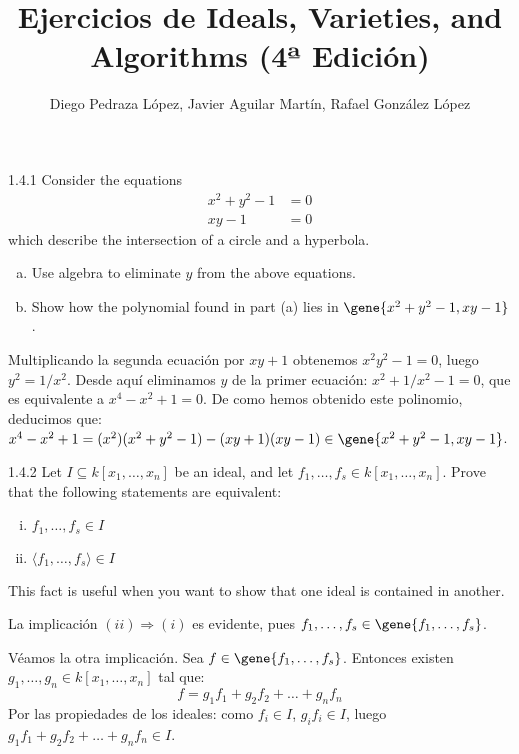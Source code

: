 \documentclass[twoside]{article}
\begin{document}
\title{Ejercicios de Ideals, Varieties, and Algorithms (4ª Edición)}
\author{Diego Pedraza López, Javier Aguilar Martín, Rafael González López}
\maketitle

\begin{ejercicio}{1.4.1}
Consider the equations
\begin{align*}
x^2 + y^2 -1 & = 0\\
xy - 1 & = 0
\end{align*}
which describe the intersection of a circle and a hyperbola.
\begin{enumerate}[a.]
\item Use algebra to eliminate $y$ from the above equations.
\item Show how the polynomial found in part (a) lies in $\gene{x^2+y^2-1, xy-1}$.
\end{enumerate}
\end{ejercicio}

\begin{solucion}
Multiplicando la segunda ecuación por $xy+1$ obtenemos $x^2y^2-1=0$, luego $y^2 = 1/x^2$.
Desde aquí eliminamos $y$ de la primer ecuación: $x^2+1/x^2-1=0$, que es equivalente a $x^4-x^2+1=0$.
De como hemos obtenido este polinomio, deducimos que: $x^4-x^2+1 = (x^2)(x^2+y^2-1)-(xy+1)(xy-1) \in \gene{x^2+y^2-1, xy-1}$.
\end{solucion}

\newpage

\begin{ejercicio}{1.4.2}
Let $I \subseteq k[x_1,\dots,x_n]$ be an ideal, and let $f_1,\dots,f_s \in k[x_1,\dots,x_n]$. Prove that the following statements are equivalent:
\begin{enumerate}[(i)]
\item $f_1,\dots,f_s \in I$
\item $\langle f_1,\dots,f_s\rangle \in I$
\end{enumerate}
This fact is useful when you want to show that one ideal is contained in another.
\end{ejercicio}

\begin{solucion}
La implicación $(ii)\Rightarrow(i)$ es evidente, pues $f_1,\dots,f_s \in \gene{f_1,\dots, f_s}$.

Véamos la otra implicación.
Sea $f \in \gene{f_1,\dots,f_s}$.
Entonces existen $g_1,\dots,g_n \in k[x_1,\dots,x_n]$ tal que:
\[ f = g_1 f_1 + g_2 f_2 + \dots + g_n f_n \]
Por las propiedades de los ideales: como $f_i \in I$, $g_i f_i \in I$, luego $g_1 f_1 + g_2 f_2 + \dots + g_n f_n \in I$.
\end{solucion}
\end{document}
